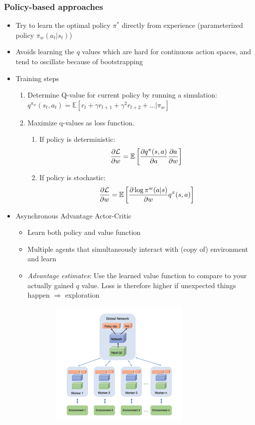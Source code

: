 \subsubsection{Policy-based approaches}
\begin{itemize}
	\item Try to learn the optimal policy $\pi^*$ directly from experience (parameterized policy $\pi_w(a_t|s_t)$)
	\item Avoids learning the $q$ values which are hard for continuous action spaces, and tend to oscillate because of bootstrapping
	\item Training steps
	\begin{enumerate}
		\item Determine Q-value for current policy by running a simulation:\\ $q^{\pi_w}(s_t, a_t) = \mathbb{E}\left[r_t + \gamma r_{t+1} + \gamma^2 r_{t+2} + ... | \pi_{w}\right]$
		\item Maximize q-values as loss function. 
		\begin{enumerate}
			\item If policy is deterministic:
			$$\frac{\partial \mathcal{L}}{\partial w} = \mathbb{E}\left[\frac{\partial q^{\pi}(s,a)}{\partial a}\frac{\partial a}{\partial w}\right]$$
			\item If policy is stochastic:
			$$\frac{\partial \mathcal{L}}{\partial w} = \mathbb{E}\left[\frac{\partial \log \pi^{w}(a|s)}{\partial w} q^{\pi}(s,a)\right]$$
		\end{enumerate}
	\end{enumerate}
	\item Asynchronous Advantage Actor-Critic
	\begin{itemize}
		\item Learn both policy and value function
		\item Multiple agents that simultaneously interact with (copy of) environment and learn
		\item \textit{Advantage estimates}: Use the learned value function to compare to your actually gained $q$ value. Loss is therefore higher if unexpected things happen $\Rightarrow$ exploration
	\end{itemize}
	\begin{figure}[ht!]
		\centering
		\begin{subfigure}{0.45\textwidth}
			\centering
			\includegraphics[width=0.8\textwidth]{figures/RL_A3C_multiple_workers.png}

\end{subfigure}
\end{figure}
\end{itemize}
